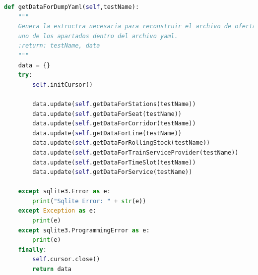 \begin{lstlisting}[language=Python,
                   style=python,
                   frame=none,
                   numbers=none,
                   basicstyle=\ttfamily\normalsize,
                   caption={Función \texttt{getDataForDumpYaml}},
                   label=src:functionGetDataForDumpYaml,
                   inputencoding=utf8]                   
def getDataForDumpYaml(self,testName):
    """
    Genera la estructra necesaria para reconstruir el archivo de oferta mediante subfunciones para cada
    uno de los apartados dentro del archivo yaml.
    :return: testName, data
    """
    data = {}
    try:
        self.initCursor()

        data.update(self.getDataForStations(testName))
        data.update(self.getDataForSeat(testName))
        data.update(self.getDataForCorridor(testName))
        data.update(self.getDataForLine(testName))
        data.update(self.getDataForRollingStock(testName))
        data.update(self.getDataForTrainServiceProvider(testName))
        data.update(self.getDataForTimeSlot(testName))
        data.update(self.getDataForService(testName))

    except sqlite3.Error as e:
        print("Sqlite Error: " + str(e))
    except Exception as e:
        print(e)
    except sqlite3.ProgrammingError as e:
        print(e)
    finally:
        self.cursor.close()
        return data
\end{lstlisting}

